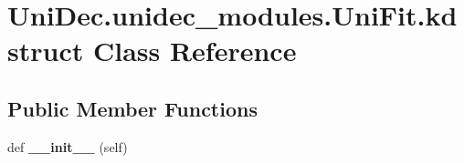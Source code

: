 \hypertarget{class_uni_dec_1_1unidec__modules_1_1_uni_fit_1_1kdstruct}{}\section{Uni\+Dec.\+unidec\+\_\+modules.\+Uni\+Fit.\+kdstruct Class Reference}
\label{class_uni_dec_1_1unidec__modules_1_1_uni_fit_1_1kdstruct}
\subsection*{Public Member Functions}
\begin{DoxyCompactItemize}
\item 
\hypertarget{class_uni_dec_1_1unidec__modules_1_1_uni_fit_1_1kdstruct_a38e774ba9925944fc95dd18b65517c63}{}def {\bfseries \+\_\+\+\_\+init\+\_\+\+\_\+} (self)\label{class_uni_dec_1_1unidec__modules_1_1_uni_fit_1_1kdstruct_a38e774ba9925944fc95dd18b65517c63}

\end{DoxyCompactItemize}
